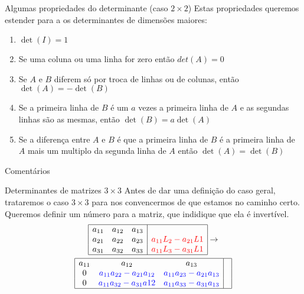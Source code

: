 \documentclass{beamer}
\begin{document}
\begin{frame}{Algumas propriedades do determinante (caso $2\times 2$)}
  Estas propriedades queremos estender para a os determinantes de dimensões maiores:
  \begin{enumerate}
    \item $\det(I)=1$ 
    \item Se uma coluna ou uma linha for zero então $det(A)=0$
    \item Se $A$ e $B$ diferem só por troca de linhas ou de colunas, então $\det(A) = -\det(B)$
    \item Se a primeira linha de $B$ é um $a$ vezes a primeira linha de $A$ e as segundas linhas são as mesmas, então 
    $\det(B) = a\det(A)$
    \item Se a diferença entre $A$ e $B$ é que a primeira linha de $B$ é a primeira linha de $A$ mais um multiplo da segunda linha de $A$ então $\det(A)=\det(B)$
  \end{enumerate}
\end{frame}
\begin{frame}{Comentários}
  
\end{frame}

\begin{frame}{Determinantes de matrizes $3\times 3$}
  Antes de dar uma definição do caso geral, trataremos o caso 
  $3\times 3$ para nos convencermos de que estamos no caminho certo.
  Queremos definir um número para a matriz, que indidique que ela é invertível.
  \begin{gather*}
    \begin{array}{|ccc|l|}\hline
      a_{11} & a_{12} & a_{13} & \\
      a_{21} & a_{22} & a_{23} & \textcolor{red}{a_{11}L_2 - a_{21}L1}\\
      a_{31} & a_{32} & a_{33} & \textcolor{red}{a_{11}L_3 - a_{31}L1}\\ \hline
      \end{array} \rightarrow \\
    \begin{array}{|ccc|l|}\hline
        a_{11} & a_{12} & a_{13} & \\
        0 & \textcolor{blue}{a_{11}a_{22}-a_{21}a_{12}} & \textcolor{blue}{a_{11}a_{23}-a_{21}a_{13}} & \\
        0 & \textcolor{blue}{a_{11}a_{32} -a_{31}a{12}} & \textcolor{blue}{a_{11}a_{33}-a_{31}a_{13}} & \\ \hline
    \end{array}
  \end{gather*}
  
\end{frame}
\end{document}

